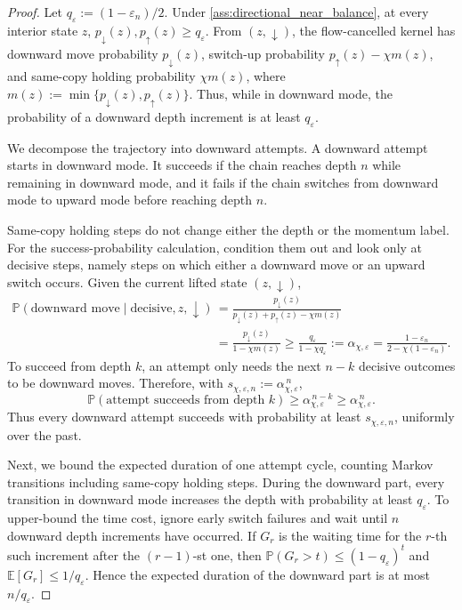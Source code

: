 \documentclass[10pt,a4paper]{amsart}
\newcommand{\bbE}{\mathbb{E}}
\newcommand{\bbP}{\mathbb{P}}
\begin{document}
\begin{proof}
Let $q_{\varepsilon}:=(1-\varepsilon_n)/2$. Under
\cref{ass:directional_near_balance}, at every interior state $z$,
$p_{\downarrow}(z),p_{\uparrow}(z)\ge q_{\varepsilon}$. From
$(z,\downarrow)$, the flow-cancelled kernel has downward move probability
$p_{\downarrow}(z)$, switch-up probability
$p_{\uparrow}(z)-\chi m(z)$, and same-copy holding probability
$\chi m(z)$, where
$m(z):=\min\{p_{\downarrow}(z),p_{\uparrow}(z)\}$. Thus, while in downward
mode, the probability of a downward depth increment is at least
$q_{\varepsilon}$.

We decompose the trajectory into downward attempts. A downward attempt starts
in downward mode. It succeeds if the chain reaches depth $n$ while remaining
in downward mode, and it fails if the chain switches from downward mode to
upward mode before reaching depth $n$.

Same-copy holding steps do not change either the depth or the momentum label.
For the success-probability calculation, condition them out and look only at
decisive steps, namely steps on which either a downward move or an upward switch
occurs. Given the current lifted state $(z,\downarrow)$,
\begin{align*}
    \bbP(\text{downward move}\mid \text{decisive},z,\downarrow)
    &=
    \frac{p_{\downarrow}(z)}
    {p_{\downarrow}(z)+p_{\uparrow}(z)-\chi m(z)}\\
    &=
    \frac{p_{\downarrow}(z)}
    {1-\chi m(z)}
    \ge
    \frac{q_\varepsilon}
    {1-\chi q_\varepsilon}
    :=
    \alpha_{\chi,\varepsilon}
    =
    \frac{1-\varepsilon_n}{2-\chi(1-\varepsilon_n)}.
\end{align*}
To succeed from depth $k$, an attempt only needs the next $n-k$ decisive
outcomes to be downward moves. Therefore, with
$s_{\chi,\varepsilon,n}:=\alpha_{\chi,\varepsilon}^{\,n}$,
\begin{equation*}
    \bbP(\text{attempt succeeds from depth }k)
    \ge
    \alpha_{\chi,\varepsilon}^{\,n-k}
    \ge
    \alpha_{\chi,\varepsilon}^{\,n}.
\end{equation*}
Thus every downward attempt succeeds with probability at least
$s_{\chi,\varepsilon,n}$, uniformly over the past.

Next, we bound the expected duration of one attempt cycle, counting Markov
transitions including same-copy holding steps. During the downward part, every
transition in downward mode increases the depth with probability at least
$q_\varepsilon$. To upper-bound the time cost, ignore early switch failures
and wait until $n$ downward depth increments have occurred. If $G_r$ is the
waiting time for the $r$-th such increment after the $(r-1)$-st one, then
$\bbP(G_r>t)\le (1-q_\varepsilon)^t$ and
$\bbE[G_r]\le 1/q_\varepsilon$. Hence the expected duration of the downward
part is at most $n/q_\varepsilon$.


\end{proof}
\end{document}
